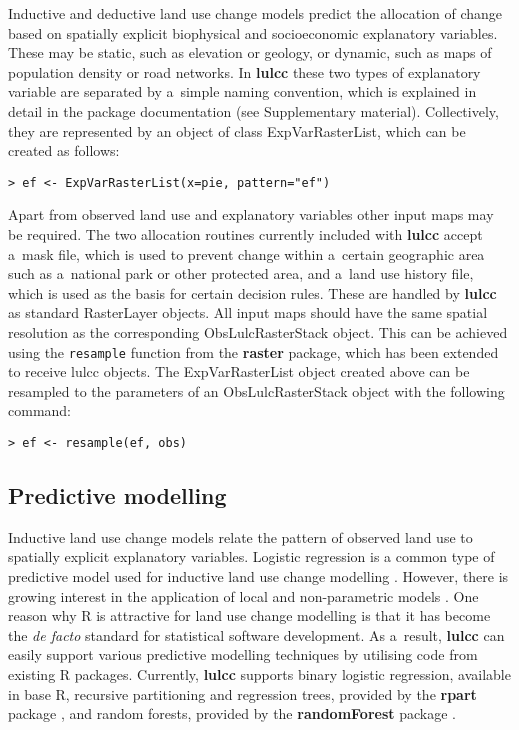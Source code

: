 \documentclass{icldt}\usepackage[]{graphicx}\usepackage[]{color}
\begin{document}
Inductive and deductive land use change models predict the allocation of change based on spatially explicit biophysical and socioeconomic explanatory variables. These may be static, such as elevation or geology, or dynamic, such as maps of population density or road networks. In \textbf{lulcc} these two types of explanatory variable are separated by a~simple naming convention, which is explained in detail in the package documentation (see Supplementary material). Collectively, they are represented by an object of class ExpVarRasterList, which can be created as follows:
\begin{verbatim}
> ef <- ExpVarRasterList(x=pie, pattern="ef")
\end{verbatim}
\noindent Apart from observed land use and explanatory variables other input maps may be required. The two allocation routines currently included with \textbf{lulcc} accept a~mask file, which is used to prevent change within a~certain geographic area such as a~national park or other protected area, and a~land use history file, which is used as the basis for certain decision rules. These are handled by \textbf{lulcc} as standard RasterLayer objects. All input maps should have the same spatial resolution as the corresponding ObsLulcRasterStack object. This can be achieved using the \texttt{resample} function from the \textbf{raster} package, which has been extended to receive lulcc objects. The ExpVarRasterList object created above can be resampled to the parameters of an ObsLulcRasterStack object with the following command:
\begin{verbatim}
> ef <- resample(ef, obs)
\end{verbatim}

\subsection{Predictive modelling}

Inductive land use change models relate the pattern of observed land use to spatially explicit explanatory variables. Logistic regression is a common type of predictive model used for inductive land use change modelling \citep[e.g.][]{pontius2001,verburg2002}. However, there is growing interest in the application of local and non-parametric models \citep[e.g.][]{tayyebi2014}. One reason why R is attractive for land use change modelling is that it has become the \textit{de facto} standard for statistical software development. As a~result, \textbf{lulcc} can easily support various predictive modelling techniques by utilising code from existing R packages. Currently, \textbf{lulcc} supports binary logistic regression, available in base R, recursive partitioning and regression trees, provided by the \textbf{rpart} package \citep{therneau2014}, and random forests, provided by the \textbf{randomForest} package \citep{liaw2002}. \\
\end{document}
